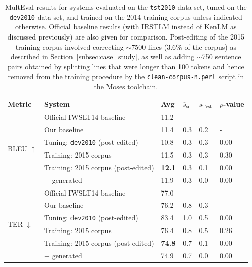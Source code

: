 {\begin{table}[htb]
\begin{center}
\begin{tabular}{|l|l|l|l|l|l|}
\hline
\bf Metric & \bf System & \bf Avg & \bf $\overline{s}_{\text{sel}}$ & \bf $s_{\text{Test}}$ & \bf $p$-value \\
\hline
\multirow{6}{*}{BLEU $\uparrow$}
& Official IWSLT14 baseline  & 11.2 & -   & -   & - \\
& Our baseline & 11.4 & 0.3 & 0.2 & - \\
& Tuning: {\small \tt dev2010} (post-edited) & 10.8 & 0.3 & 0.3 & 0.00 \\
& Training: 2015 corpus & 11.5 & 0.3 & 0.3 & 0.30 \\
& Training: 2015 corpus (post-edited) & \textbf{12.1} & 0.3 & 0.1 & 0.00 \\
& + generated & 11.9 & 0.3 & 0.0 & 0.00 \\ 
\hline
\multirow{6}{*}{TER $\downarrow$}
& Official IWSLT14 baseline & 77.0 & -   & -   & - \\
& Our baseline & 76.2 & 0.8 & 0.3 & - \\
& Tuning: {\small \tt dev2010} (post-edited) & 83.4 & 1.0 & 0.5 & 0.00 \\
& Training: 2015 corpus & 76.4 & 0.8 & 0.5 & 0.26 \\
& Training: 2015 corpus (post-edited) & \textbf{74.8} & 0.7 & 0.1 & 0.00 \\
& + generated & 74.9 & 0.7 & 0.0 & 0.00 \\ 
\hline
\end{tabular}
\end{center}

\caption{\label{tab:multeval_tst2010} %
MultEval results for systems evaluated on the {\small \tt tst2010} data set, tuned on the {\small \tt dev2010} data set,  and trained on the 2014 training corpus unless indicated otherwise.
Official baseline results (with IRSTLM instead of KenLM as discussed previously) are also given for comparison.
Post-editing of the 2015 training corpus involved correcting $\sim$7500 lines (3.6\% of the corpus) as described in Section~\ref{subsec:case_study}, as well as adding $\sim$750 sentence pairs obtained by splitting lines that were longer than 100 tokens and hence removed from the training procedure by the {\small \tt clean-corpus-n.perl} script in the Moses toolchain.
} %
\end{table}

}
